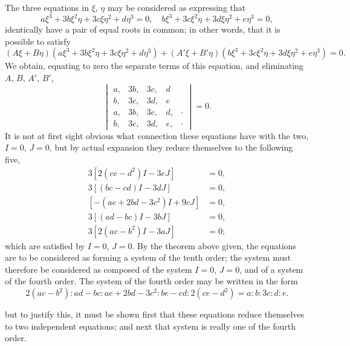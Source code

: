 \documentclass[11pt,a4paper]{article}
\theoremstyle{definition}
\begin{document}
The three equations in $\xi$, $\eta$ may be considered as expressing that
\[
a\xi^{3} + 3b\xi^{2}\eta + 3c\xi\eta^{2} + d\eta^{3} = 0, \quad b\xi^{3} + 3c\xi^{2}\eta + 3d\xi\eta^{2} + e\eta^{3} = 0,
\]
identically have a pair of equal roots in common; in other words, that it is possible to satisfy
\[
(A\xi + B\eta)(a\xi^{3} + 3b\xi^{2}\eta + 3c\xi\eta^{2} + d\eta^{3}) + (A'\xi + B'\eta)(b\xi^{3} + 3c\xi^{2}\eta + 3d\xi\eta^{2} + e\eta^{3}) = 0.
\]
We obtain, equating to zero the separate terms of this equation, and eliminating $A$, $B$, $A'$, $B'$,
\[
\begin{vmatrix}
a, & 3b, & 3c, & d \\
b, & 3c, & 3d, & e \\
a, & 3b, & 3c, & d, & \cdot \\
b, & 3c, & 3d, & e, & \cdot
\end{vmatrix} = 0.
\]
It is not at first sight obvious what connection these equations have with the two, $I = 0$, $J = 0$, but by actual expansion they reduce themselves to the following five,
\begin{align*}
3[2(ce - d^{2})I - 3eJ] &= 0, \\
3[(bc - cd)I - 3dJ] &= 0, \\
[-(ae + 2bd - 3c^{2})I + 9cJ] &= 0, \\
3[(ad - bc)I - 3bJ] &= 0, \\
3[2(ac - b^{2})I - 3aJ] &= 0;
\end{align*}
which are satisfied by $I = 0$, $J = 0$. By the theorem above given, the equations are to be considered as forming a system of the tenth order; the system must therefore be considered as composed of the system $I = 0$, $J = 0$, and of a system of the fourth order. The system of the fourth order may be written in the form
\[
2(ac - b^{2}) : ad - bc : ae + 2bd - 3c^{2} : be - cd : 2(ce - d^{2}) = a : b : 3c : d : e.
\]

\newpage

\setcounter{page}{461}

but to justify this, it must be shown first that these equations reduce themselves to two independent equations; and next that system is really one of the fourth order.
\end{document}
